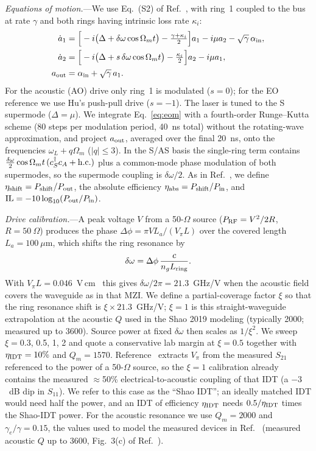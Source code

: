 \documentclass[aps,prapplied,reprint,superscriptaddress,amsmath,amssymb,floatfix]{revtex4-2}
\newcommand{\etash}{\eta_{\rm shift}}
\newcommand{\etaabs}{\eta_{\rm abs}}
\newcommand{\Pg}{P_{\rm RF}}
\begin{document}
\emph{Equations of motion.}---We use Eq.~(S2) of Ref.~\cite{Hu2021}, with ring~1 coupled to the bus at rate $\gamma$ and both rings having intrinsic loss rate $\kappa_i$:
\begin{align}
\dot a_1&=\Big[-i\big(\Delta+\delta\omega\cos\Omega_m t\big)-\tfrac{\gamma+\kappa_i}{2}\Big]a_1-i\mu a_2-\sqrt{\gamma}\,\alpha_{\rm in},\nonumber\\
\dot a_2&=\Big[-i\big(\Delta+s\,\delta\omega\cos\Omega_m t\big)-\tfrac{\kappa_i}{2}\Big]a_2-i\mu a_1,\nonumber\\
a_{\rm out}&=\alpha_{\rm in}+\sqrt{\gamma}\,a_1 .
\label{eq:eom}
\end{align}
For the acoustic (AO) drive only ring~1 is modulated ($s=0$); for the EO reference we use Hu's push-pull drive ($s=-1$). The laser is tuned to the S supermode ($\Delta=\mu$). We integrate Eq.~\eqref{eq:eom} with a fourth-order Runge--Kutta scheme (80 steps per modulation period, 40~ns total) without the rotating-wave approximation, and project $a_{\rm out}$, averaged over the final 20~ns, onto the frequencies $\omega_L+q\Omega_m$ ($|q|\le3$). In the S/AS basis the single-ring term contains $\tfrac{\delta\omega}{2}\cos\Omega_m t\,(c_S^\dagger c_A+{\rm h.c.})$ plus a common-mode phase modulation of both supermodes, so the supermode coupling is $\delta\omega/2$. As in Ref.~\cite{Hu2021}, we define $\etash=P_{\rm shift}/P_{\rm out}$, the absolute efficiency $\etaabs=P_{\rm shift}/P_{\rm in}$, and ${\rm IL}=-10\log_{10}(P_{\rm out}/P_{\rm in})$.

\emph{Drive calibration.}---A peak voltage $V$ from a 50-$\Omega$ source ($\Pg=V^2/2R$, $R=50~\Omega$) produces the phase $\Delta\phi=\pi V L_a/(V_\pi L)$ over the covered length $L_a=100~\mu$m, which shifts the ring resonance by
\begin{equation}
\delta\omega=\Delta\phi\,\frac{c}{n_g L_{\rm ring}} .
\label{eq:cal}
\end{equation}
With $V_\pi L=0.046$~V\,cm~\cite{Shao2019} this gives $\delta\omega/2\pi=21.3$~GHz/V when the acoustic field covers the waveguide as in that MZI. We define a partial-coverage factor $\xi$ so that the ring resonance shift is $\xi\times21.3$~GHz/V; $\xi=1$ is this straight-waveguide extrapolation at the acoustic $Q$ used in the Shao 2019 modeling (typically 2000; measured up to 3600). Source power at fixed $\delta\omega$ then scales as $1/\xi^2$. We sweep $\xi=0.3$, 0.5, 1, 2 and quote a conservative lab margin at $\xi=0.5$ together with $\eta_{\rm IDT}=10\%$ and $Q_m=1570$. Reference~\cite{Shao2019} extracts $V_\pi$ from the measured $S_{21}$ referenced to the power of a 50-$\Omega$ source, so the $\xi=1$ calibration already contains the measured $\approx$50\% electrical-to-acoustic coupling of that IDT (a $-3$~dB dip in $S_{11}$). We refer to this case as the ``Shao IDT''; an ideally matched IDT would need half the power, and an IDT of efficiency $\eta_{\rm IDT}$ needs $0.5/\eta_{\rm IDT}$ times the Shao-IDT power. For the acoustic resonance we use $Q_m=2000$ and $\gamma_e/\gamma=0.15$, the values used to model the measured devices in Ref.~\cite{Shao2019} (measured acoustic $Q$ up to 3600, Fig.~3(c) of Ref.~\cite{Shao2019}).
\end{document}

